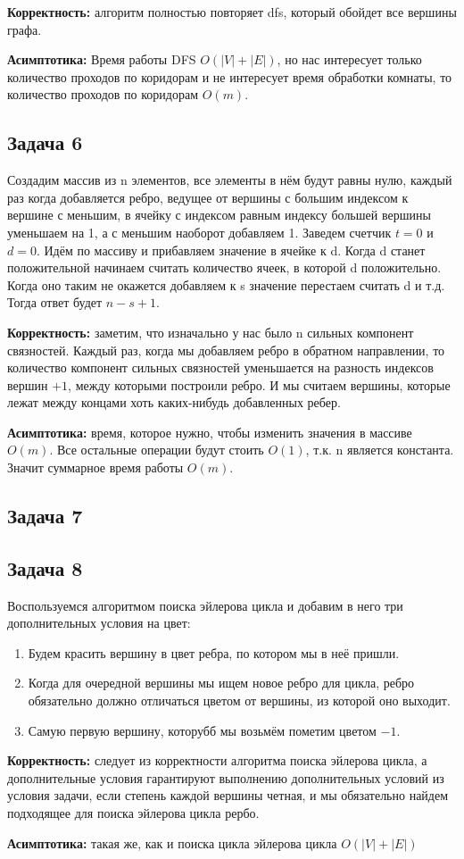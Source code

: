 \documentclass[a4paper,14pt]{article} %
\begin{document}
\textbf{Корректность:} алгоритм полностью повторяет dfs, который обойдет все вершины графа.

\textbf{Асимптотика:} Время работы DFS $O(|V| + |E|)$, но нас интересует только количество проходов по коридорам и не интересует время обработки комнаты, то количество проходов по коридорам $O(m)$.

\subsection{Задача 6}
Создадим массив из n элементов, все элементы в нём будут равны нулю, каждый раз когда добавляется ребро, ведущее от вершины с большим индексом к вершине с меньшим, в ячейку
с индексом равным индексу большей вершины уменьшаем на 1, а с меньшим наоборот добавляем 1.
Заведем счетчик $t = 0$ и $d = 0$. Идём по массиву и прибавляем значение в ячейке к d. Когда d станет положительной начинаем считать количество ячеек, в которой d положительно.
Когда оно таким не окажется добавляем к s значение перестаем считать d и т.д.
Тогда ответ будет $n - s + 1$.

\textbf{Корректность:} заметим, что изначально у нас было n сильных компонент связностей. Каждый раз, когда мы добавляем ребро в обратном направлении, то количество компонент сильных связностей уменьшается на разность индексов вершин $ + 1$, 
между которыми построили ребро. И мы считаем вершины, которые лежат между концами хоть каких-нибудь добавленных ребер.

\textbf{Асимптотика:} время, которое нужно, чтобы изменить значения в массиве $O(m)$. Все остальные операции будут стоить $O(1)$, т.к. n является константа.
Значит суммарное время работы $O(m)$.

\subsection{Задача 7}
\subsection{Задача 8}
Воспользуемся алгоритмом поиска эйлерова цикла и добавим в него три дополнительных условия на цвет:
\begin{enumerate}
	\item Будем красить вершину в цвет ребра, по котором мы в неё пришли.
	\item Когда для очередной вершины мы ищем новое ребро для цикла, ребро обязательно должно отличаться цветом от вершины, из которой оно выходит.
	\item Самую первую вершину, которубб мы возьмём пометим цветом $-1$.
\end{enumerate}
\textbf{Корректность:} следует из корректности алгоритма поиска эйлерова цикла, а дополнительные условия гарантируют выполнению дополнительных условий из условия задачи, 
если степень каждой вершины четная, и мы обязательно найдем подходящее для поиска эйлерова цикла рербо.

\textbf{Асимптотика:} такая же, как и поиска цикла эйлерова цикла $O(|V|+|E|)$
\end{document}
